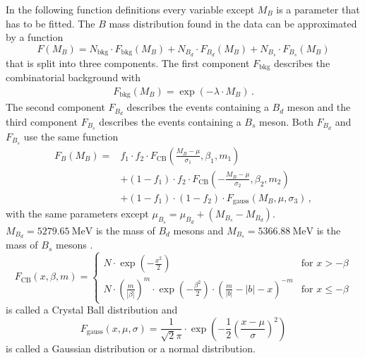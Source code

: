 In the following function definitions every variable except $M_B$ is a parameter that has to be fitted.
The $B$ mass distribution found in the data can be approximated by a function
\begin{equation*}
    F(M_B) = N_\text{bkg} \cdot F_\text{bkg}(M_B) + N_{B_d} \cdot F_{B_d}(M_B) + N_{B_s} \cdot F_{B_s}(M_B)
\end{equation*}
that is split into three components.
The first component $F_\text{bkg}$ describes the combinatorial background with 
\begin{align*}
    F_\text{bkg}(M_B) = \exp(-\lambda \cdot M_B) \, .
\end{align*}
The second component $F_{B_d}$ describes the events containing a $B_d$ meson and the third component $F_{B_s}$ describes the events containing a $B_s$ meson.
Both $F_{B_d}$ and $F_{B_s}$ use the same function
\begin{align*}
    F_B(M_B) = &f_1 \cdot f_2 \cdot F_\text{CB}\left(\frac{M_B-\mu}{\sigma_1}, \beta_1, m_1\right) \\
                    &+ (1-f_1) \cdot f_2 \cdot F_\text{CB}\left(-\frac{M_B-\mu}{\sigma_2}, \beta_2, m_2\right) \\
                    &+ (1-f_1) \cdot (1-f_2) \cdot F_\text{gauss}\left(M_B,\mu,\sigma_3\right) \, ,
\end{align*}
with the same parameters except $\mu_{B_s} = \mu_{B_d} + (M_{B_s}-M_{B_d})$.
$M_{B_d}=\qty{5279.65}{\MeV}$ is the mass of $B_d$ mesons and $M_{B_s}=\qty{5366.88}{\MeV}$ is the mass of $B_s$ mesons \cite{pdg}.
\begin{equation*}
    F_\text{CB}(x,\beta,m) = 
     \begin{cases}
         N \cdot \exp(-\frac{x^2}{2}) & \text{for } x > -\beta \\
         N \cdot \left(\frac{m}{|\beta|}\right)^m \cdot \exp\left(-\frac{\beta^2}{2}\right) \cdot \left(\frac{m}{|b|}-|b| - x\right)^{-m} & \text{for } x \leq -\beta
     \end{cases}
\end{equation*}
is called a Crystal Ball distribution and
\begin{equation*}
    F_\text{gauss}\left(x,\mu,\sigma\right) = \frac{1}{\sqrt{2}\pi} \cdot \exp\left(-\frac{1}{2}\left(\frac{x-\mu}{\sigma}\right)^2\right)
\end{equation*}
is called a Gaussian distribution or a normal distribution.


